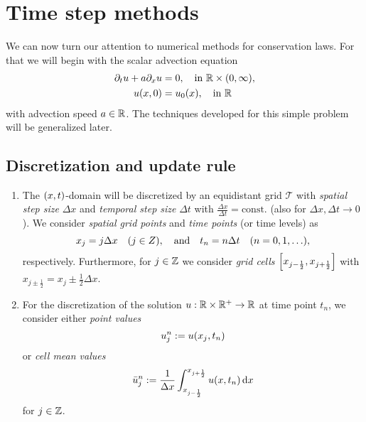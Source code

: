 \section{Time step methods}

We can now turn our attention to numerical methods for conservation laws.
For that we will begin with the scalar advection equation
\begin{align*}
	\partial_t u + a\partial_x u &= 0, \quad \text{in }\R \times \parentheses*{0, \infty},\\
	u\parentheses*{x, 0} &= u_0\parentheses*{x}, \quad \text{in }\R
\end{align*}
with advection speed \(a \in \R\).
The techniques developed for this simple problem will be generalized later.


\subsection{Discretization and update rule}

\begin{definition}
	\begin{enumerate}
		\item The \(\parentheses*{x, t}\)-domain will be discretized by an equidistant grid \(\mathcal{T}\) with \emph{spatial step size} \(\Delta x\) and \emph{temporal step size} \(\Delta t\) with \(\frac{\Delta x}{\Delta t} = \text{const.}\) (also for \(\Delta x, \Delta t \to 0\)).
		We consider \emph{spatial grid points} and \emph{time points} (or time levels) as
		\[
			x_j = j\Delta x \quad \parentheses*{j \in Z}, \quad \text{and} \quad t_n = n\Delta t \quad \parentheses*{n = 0, 1, \ldots},
		\]
		respectively.
		Furthermore, for \(j \in \Z\) we consider \emph{grid cells} \(\brackets*{x_{j - \frac{1}{2}}, x_{j + \frac{1}{2}}}\) with \(x_{j \pm \frac{1}{2}} = x_j \pm \frac{1}{2}\Delta x\).
		\item For the discretization of the solution \(u: \R \times \R^+ \to \R\) at time point \(t_n\), we consider either \emph{point values}
		\[
			u_j^n := u\parentheses*{x_j, t_n}
		\]
		or \emph{cell mean values}
		\[
			\bar{u}_j^n := \frac{1}{\Delta x}\int_{x_{j - \frac{1}{2}}}^{x_{j + \frac{1}{2}}}u\parentheses*{x, t_n}\d x
		\]
		for \(j \in \Z\).
	\end{enumerate}
\end{definition}

